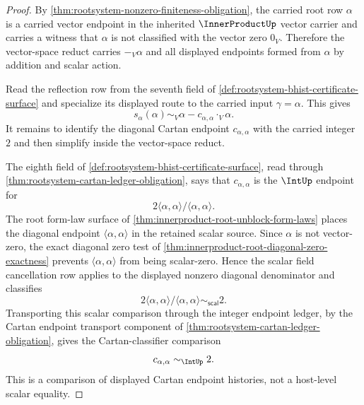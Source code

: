 \begin{proof}
By \autoref{thm:rootsystem-nonzero-finiteness-obligation}, the carried root row $\alpha$ is a carried vector endpoint in the inherited $\InnerProductUp$ vector carrier and carries a witness that $\alpha$ is not classified with the vector zero $0_V$. Therefore the vector-space reduct carries $-_V\alpha$ and all displayed endpoints formed from $\alpha$ by addition and scalar action.

Read the reflection row from the seventh field of \autoref{def:rootsystem-bhist-certificate-surface} and specialize its displayed route to the carried input $\gamma=\alpha$. This gives
$$
s_\alpha(\alpha)
\sim_V
\alpha-c_{\alpha,\alpha}\cdot_V\alpha.
$$
It remains to identify the diagonal Cartan endpoint $c_{\alpha,\alpha}$ with the carried integer $2$ and then simplify inside the vector-space reduct.

The eighth field of \autoref{def:rootsystem-bhist-certificate-surface}, read through \autoref{thm:rootsystem-cartan-ledger-obligation}, says that $c_{\alpha,\alpha}$ is the $\IntUp$ endpoint for
$$
2\langle\alpha,\alpha\rangle/\langle\alpha,\alpha\rangle.
$$
The root form-law surface of \autoref{thm:innerproduct-root-unblock-form-laws} places the diagonal endpoint $\langle\alpha,\alpha\rangle$ in the retained scalar source. Since $\alpha$ is not vector-zero, the exact diagonal zero test of \autoref{thm:innerproduct-root-diagonal-zero-exactness} prevents $\langle\alpha,\alpha\rangle$ from being scalar-zero. Hence the scalar field cancellation row applies to the displayed nonzero diagonal denominator and classifies
$$
2\langle\alpha,\alpha\rangle/\langle\alpha,\alpha\rangle
\sim_{\mathsf{scal}}
2.
$$
Transporting this scalar comparison through the integer endpoint ledger, by the Cartan endpoint transport component of \autoref{thm:rootsystem-cartan-ledger-obligation}, gives the Cartan-classifier comparison
$$
c_{\alpha,\alpha}\sim_{\IntUp}2.
$$
This is a comparison of displayed Cartan endpoint histories, not a host-level scalar equality.


\end{proof}
